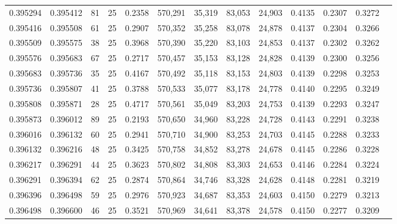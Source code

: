 \begin{tabular}{rrrrrrrrrrrrr}
0.395294 & 0.395412 &    81 &  25 &                                     0.2358 & 570,291 &  35,319 &  83,053 &  24,903 & 0.4135 & 0.2307 & 0.3272 \\
0.395416 & 0.395508 &    61 &  25 &                                     0.2907 & 570,352 &  35,258 &  83,078 &  24,878 & 0.4137 & 0.2304 & 0.3266 \\
0.395509 & 0.395575 &    38 &  25 &                                     0.3968 & 570,390 &  35,220 &  83,103 &  24,853 & 0.4137 & 0.2302 & 0.3262 \\
0.395576 & 0.395683 &    67 &  25 &                                     0.2717 & 570,457 &  35,153 &  83,128 &  24,828 & 0.4139 & 0.2300 & 0.3256 \\
0.395683 & 0.395736 &    35 &  25 &                                     0.4167 & 570,492 &  35,118 &  83,153 &  24,803 & 0.4139 & 0.2298 & 0.3253 \\
0.395736 & 0.395807 &    41 &  25 &                                     0.3788 & 570,533 &  35,077 &  83,178 &  24,778 & 0.4140 & 0.2295 & 0.3249 \\
0.395808 & 0.395871 &    28 &  25 &                                     0.4717 & 570,561 &  35,049 &  83,203 &  24,753 & 0.4139 & 0.2293 & 0.3247 \\
0.395873 & 0.396012 &    89 &  25 &                                     0.2193 & 570,650 &  34,960 &  83,228 &  24,728 & 0.4143 & 0.2291 & 0.3238 \\
0.396016 & 0.396132 &    60 &  25 &                                     0.2941 & 570,710 &  34,900 &  83,253 &  24,703 & 0.4145 & 0.2288 & 0.3233 \\
0.396132 & 0.396216 &    48 &  25 &                                     0.3425 & 570,758 &  34,852 &  83,278 &  24,678 & 0.4145 & 0.2286 & 0.3228 \\
0.396217 & 0.396291 &    44 &  25 &                                     0.3623 & 570,802 &  34,808 &  83,303 &  24,653 & 0.4146 & 0.2284 & 0.3224 \\
0.396291 & 0.396394 &    62 &  25 &                                     0.2874 & 570,864 &  34,746 &  83,328 &  24,628 & 0.4148 & 0.2281 & 0.3219 \\
0.396396 & 0.396498 &    59 &  25 &                                     0.2976 & 570,923 &  34,687 &  83,353 &  24,603 & 0.4150 & 0.2279 & 0.3213 \\
0.396498 & 0.396600 &    46 &  25 &                                     0.3521 & 570,969 &  34,641 &  83,378 &  24,578 & 0.4150 & 0.2277 & 0.3209 \\

\end{tabular}
